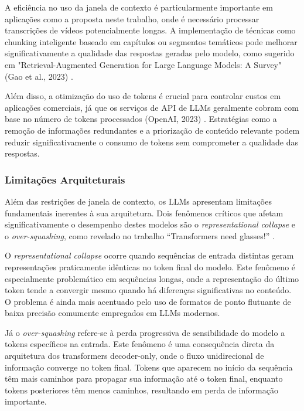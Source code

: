 \documentclass[tcc,capa]{texufpel}
\begin{document}
A eficiência no uso da janela de contexto é particularmente importante em aplicações como a proposta neste trabalho, onde é necessário processar transcrições de vídeos potencialmente longas. A implementação de técnicas como chunking inteligente baseado em capítulos ou segmentos temáticos pode melhorar significativamente a qualidade das respostas geradas pelo modelo, como sugerido em "Retrieval-Augmented Generation for Large Language Models: A Survey" (Gao et al., 2023) \cite{gao2023retrieval}.

Além disso, a otimização do uso de tokens é crucial para controlar custos em aplicações comerciais, já que os serviços de API de LLMs geralmente cobram com base no número de tokens processados (OpenAI, 2023) \cite{openai2023pricing}. Estratégias como a remoção de informações redundantes e a priorização de conteúdo relevante podem reduzir significativamente o consumo de tokens sem comprometer a qualidade das respostas.

\subsubsection{Limitações Arquiteturais}

Além das restrições de janela de contexto, os LLMs apresentam limitações fundamentais inerentes à sua arquitetura. Dois fenômenos críticos que afetam significativamente o desempenho destes modelos são o \textit{representational collapse} e o \textit{over-squashing}, como revelado no trabalho ``Transformers need glasses!'' \cite{barbero2024transformers}.

O \textit{representational collapse} ocorre quando sequências de entrada distintas geram representações praticamente idênticas no token final do modelo. Este fenômeno é especialmente problemático em sequências longas, onde a representação do último token tende a convergir mesmo quando há diferenças significativas no conteúdo. O problema é ainda mais acentuado pelo uso de formatos de ponto flutuante de baixa precisão comumente empregados em LLMs modernos.

Já o \textit{over-squashing} refere-se à perda progressiva de sensibilidade do modelo a tokens específicos na entrada. Este fenômeno é uma consequência direta da arquitetura dos transformers decoder-only, onde o fluxo unidirecional de informação converge no token final. Tokens que aparecem no início da sequência têm mais caminhos para propagar sua informação até o token final, enquanto tokens posteriores têm menos caminhos, resultando em perda de informação importante.
\end{document}
